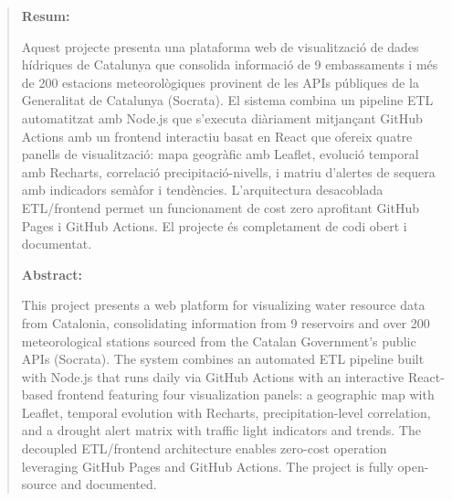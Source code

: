 
\begin{abstract}
\addchaptertocentry{\abstractname}

\textbf{Resum:} \hfill

\vspace{0.3cm}

Aquest projecte presenta una plataforma web de visualització de dades hídriques de Catalunya que consolida informació de 9 embassaments i més de 200 estacions meteorològiques provinent de les APIs públiques de la Generalitat de Catalunya (Socrata). El sistema combina un pipeline ETL automatitzat amb Node.js que s'executa diàriament mitjançant GitHub Actions amb un frontend interactiu basat en React que ofereix quatre panells de visualització: mapa geogràfic amb Leaflet, evolució temporal amb Recharts, correlació precipitació-nivells, i matriu d'alertes de sequera amb indicadors semàfor i tendències. L'arquitectura desacoblada ETL/frontend permet un funcionament de cost zero aprofitant GitHub Pages i GitHub Actions. El projecte és completament de codi obert i documentat.

\vspace{1cm}

\textbf{Abstract:}

\vspace{0.3cm}

This project presents a web platform for visualizing water resource data from Catalonia, consolidating information from 9 reservoirs and over 200 meteorological stations sourced from the Catalan Government's public APIs (Socrata). The system combines an automated ETL pipeline built with Node.js that runs daily via GitHub Actions with an interactive React-based frontend featuring four visualization panels: a geographic map with Leaflet, temporal evolution with Recharts, precipitation-level correlation, and a drought alert matrix with traffic light indicators and trends. The decoupled ETL/frontend architecture enables zero-cost operation leveraging GitHub Pages and GitHub Actions. The project is fully open-source and documented.

\end{abstract}
